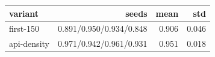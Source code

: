 \begin{tabular}{lrrr}
\toprule
variant & seeds & mean & std \\
\midrule
first-150 & 0.891/0.950/0.934/0.848 & 0.906 & 0.046 \\
api-density & 0.971/0.942/0.961/0.931 & 0.951 & 0.018 \\
\bottomrule
\end{tabular}
